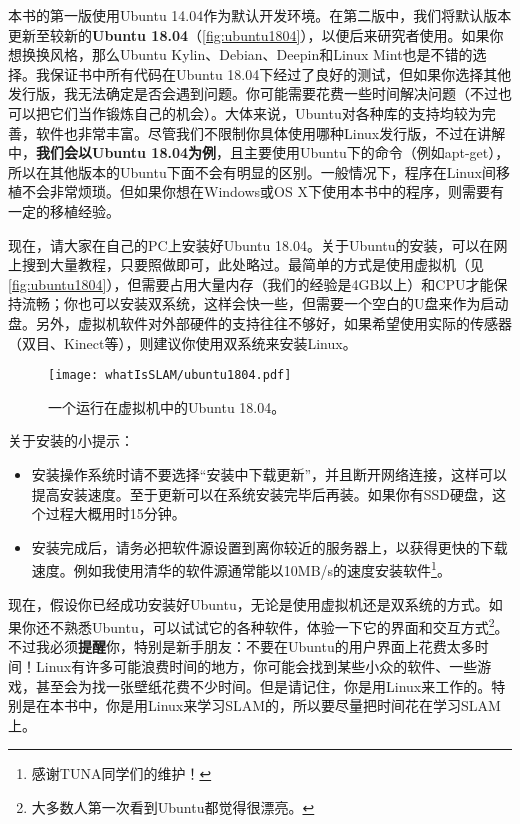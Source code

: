 本书的第一版使用Ubuntu 14.04作为默认开发环境。在第二版中，我们将默认版本更新至较新的\textbf{Ubuntu 18.04}（\autoref{fig:ubuntu1804}），以便后来研究者使用。如果你想换换风格，那么Ubuntu Kylin、Debian、Deepin和Linux Mint也是不错的选择。我保证书中所有代码在Ubuntu 18.04下经过了良好的测试，但如果你选择其他发行版，我无法确定是否会遇到问题。你可能需要花费一些时间解决问题（不过也可以把它们当作锻炼自己的机会）。大体来说，Ubuntu对各种库的支持均较为完善，软件也非常丰富。尽管我们不限制你具体使用哪种Linux发行版，不过在讲解中，\textbf{我们会以Ubuntu 18.04为例}，且主要使用Ubuntu下的命令（例如apt-get），所以在其他版本的Ubuntu下面不会有明显的区别。一般情况下，程序在Linux间移植不会非常烦琐。但如果你想在Windows或OS X下使用本书中的程序，则需要有一定的移植经验。

现在，请大家在自己的PC上安装好Ubuntu 18.04。关于Ubuntu的安装，可以在网上搜到大量教程，只要照做即可，此处略过。最简单的方式是使用虚拟机（见\autoref{fig:ubuntu1804}），但需要占用大量内存（我们的经验是4GB以上）和CPU才能保持流畅；你也可以安装双系统，这样会快一些，但需要一个空白的U盘来作为启动盘。另外，虚拟机软件对外部硬件的支持往往不够好，如果希望使用实际的传感器（双目、Kinect等），则建议你使用双系统来安装Linux。

\begin{figure}[!ht]
	\centering
	\texttt{[image: whatIsSLAM/ubuntu1804.pdf]}
	\caption{一个运行在虚拟机中的Ubuntu 18.04。}
	\label{fig:ubuntu1804}
\end{figure}

关于安装的小提示：
\begin{itemize}
	\item 安装操作系统时请不要选择“安装中下载更新”，并且断开网络连接，这样可以提高安装速度。至于更新可以在系统安装完毕后再装。如果你有SSD硬盘，这个过程大概用时15分钟。
	\item 安装完成后，请务必把软件源设置到离你较近的服务器上，以获得更快的下载速度。例如我使用清华的软件源通常能以10MB/s的速度安装软件\footnote{感谢TUNA同学们的维护！}。
\end{itemize}

现在，假设你已经成功安装好Ubuntu，无论是使用虚拟机还是双系统的方式。如果你还不熟悉Ubuntu，可以试试它的各种软件，体验一下它的界面和交互方式\footnote{大多数人第一次看到Ubuntu都觉得很漂亮。}。不过我必须\textbf{提醒}你，特别是新手朋友：不要在Ubuntu的用户界面上花费太多时间！Linux有许多可能浪费时间的地方，你可能会找到某些小众的软件、一些游戏，甚至会为找一张壁纸花费不少时间。但是请记住，你是用Linux来工作的。特别是在本书中，你是用Linux来学习SLAM的，所以要尽量把时间花在学习SLAM上。

